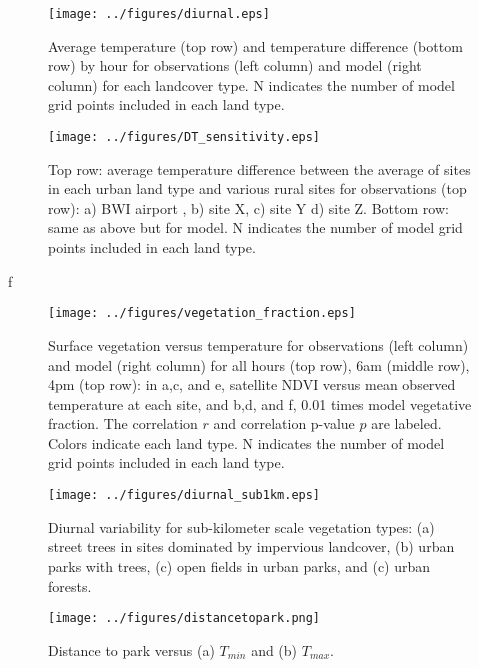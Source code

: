 \documentclass[draft,linenumbers]{agujournal}
\begin{document}
\begin{figure}[h]
\centering
\texttt{[image: ../figures/diurnal.eps]}
\caption{Average temperature (top row) and temperature difference (bottom row) by hour for observations (left column) and model (right column) for each landcover type. N indicates the number of model grid points included in each land type. }
\label{fig:diurnal}
\end{figure}

\begin{figure}[h]
\centering
\texttt{[image: ../figures/DT\_sensitivity.eps]}
\caption{Top row: average temperature difference between the average of sites in each urban land type and various rural sites for observations (top row): a) BWI airport , b) site X, c) site Y  d) site Z. Bottom row: same as above but for model. N indicates the number of model grid points included in each land type.
}
\label{fig:dt_sensitivity}
\end{figure}f


\begin{figure}[h]
\centering
\texttt{[image: ../figures/vegetation\_fraction.eps]}
\caption{Surface vegetation versus temperature for observations (left column) and model (right column) for all hours (top row), 6am (middle row), 4pm (top row): in a,c, and e, satellite NDVI versus mean observed temperature at each site, and b,d, and f, 0.01 times model vegetative fraction. The correlation $r$ and correlation p-value $p$ are labeled. Colors indicate each land type. N indicates the number of model grid points included in each land type.}
\label{fig:veg}
\end{figure}

\begin{figure}
\centering
\texttt{[image: ../figures/diurnal\_sub1km.eps]}
\caption{Diurnal variability for sub-kilometer scale vegetation types: (a) street trees in sites dominated by impervious landcover, (b) urban parks with trees, (c) open fields in urban parks, and (c) urban forests. }
\label{fig:diurnal_urbanforests_etc}
\end{figure}

\begin{figure}
\centering
\texttt{[image: ../figures/distancetopark.png]}
\caption{Distance to park versus (a) $T_{min}$ and (b) $T_{max}$.}
\label{fig:distance to park}
\end{figure}
\end{document}
